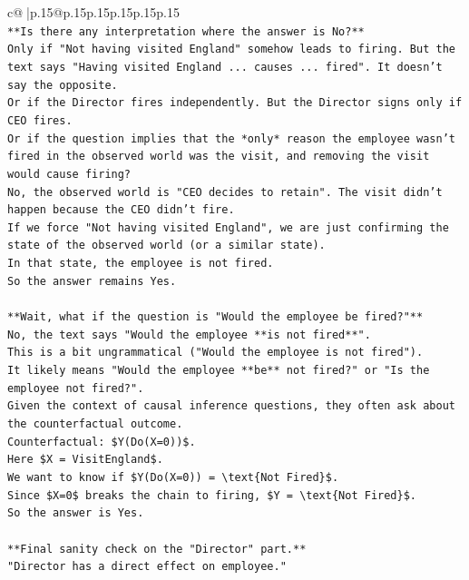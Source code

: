 \documentclass{article}
\begin{document}
{\begin{supertabular}{c@{$\;$}|p{.15\linewidth}@{}p{.15\linewidth}p{.15\linewidth}p{.15\linewidth}p{.15\linewidth}p{.15\linewidth}}
{{{\\ 
\texttt{**Is there any interpretation where the answer is No?**} \\
\texttt{Only if "Not having visited England" somehow leads to firing. But the text says "Having visited England ... causes ... fired". It doesn't say the opposite.} \\
\texttt{Or if the Director fires independently. But the Director signs only if CEO fires.} \\
\texttt{Or if the question implies that the *only* reason the employee wasn't fired in the observed world was the visit, and removing the visit would cause firing?} \\
\texttt{No, the observed world is "CEO decides to retain". The visit didn't happen because the CEO didn't fire.} \\
\texttt{If we force "Not having visited England", we are just confirming the state of the observed world (or a similar state).} \\
\texttt{In that state, the employee is not fired.} \\
\texttt{So the answer remains Yes.} \\
\\ 
\texttt{**Wait, what if the question is "Would the employee be fired?"**} \\
\texttt{No, the text says "Would the employee **is not fired**".} \\
\texttt{This is a bit ungrammatical ("Would the employee is not fired").} \\
\texttt{It likely means "Would the employee **be** not fired?" or "Is the employee not fired?".} \\
\texttt{Given the context of causal inference questions, they often ask about the counterfactual outcome.} \\
\texttt{Counterfactual: \$Y(Do(X=0))\$.} \\
\texttt{Here \$X = VisitEngland\$.} \\
\texttt{We want to know if \$Y(Do(X=0)) = \textbackslash{}text\{Not Fired\}\$.} \\
\texttt{Since \$X=0\$ breaks the chain to firing, \$Y = \textbackslash{}text\{Not Fired\}\$.} \\
\texttt{So the answer is Yes.} \\
\\ 
\texttt{**Final sanity check on the "Director" part.**} \\
\texttt{"Director has a direct effect on employee."} \\
}}}
\end{supertabular}}
\end{document}
